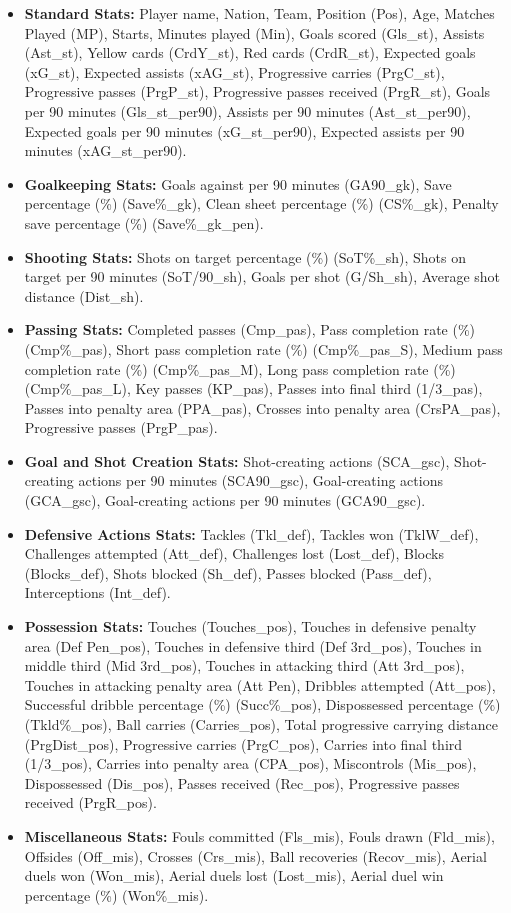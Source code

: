 \documentclass[12pt]{article}
\begin{document}
\begin{itemize}
    \item \textbf{Standard Stats:} Player name, Nation, Team, Position (Pos), Age, Matches Played (MP), Starts, Minutes played (Min), Goals scored (Gls\_st), Assists (Ast\_st), Yellow cards (CrdY\_st), Red cards (CrdR\_st), Expected goals (xG\_st), Expected assists (xAG\_st), Progressive carries (PrgC\_st), Progressive passes (PrgP\_st), Progressive passes received (PrgR\_st), Goals per 90 minutes (Gls\_st\_per90), Assists per 90 minutes (Ast\_st\_per90), Expected goals per 90 minutes (xG\_st\_per90), Expected assists per 90 minutes (xAG\_st\_per90).
    \item \textbf{Goalkeeping Stats:} Goals against per 90 minutes (GA90\_gk), Save percentage (\%) (Save\%\_gk), Clean sheet percentage (\%) (CS\%\_gk), Penalty save percentage (\%) (Save\%\_gk\_pen).
    \item \textbf{Shooting Stats:} Shots on target percentage (\%) (SoT\%\_sh), Shots on target per 90 minutes (SoT/90\_sh), Goals per shot (G/Sh\_sh), Average shot distance (Dist\_sh).
    \item \textbf{Passing Stats:} Completed passes (Cmp\_pas), Pass completion rate (\%) (Cmp\%\_pas), Short pass completion rate (\%) (Cmp\%\_pas\_S), Medium pass completion rate (\%) (Cmp\%\_pas\_M), Long pass completion rate (\%) (Cmp\%\_pas\_L), Key passes (KP\_pas), Passes into final third (1/3\_pas), Passes into penalty area (PPA\_pas), Crosses into penalty area (CrsPA\_pas), Progressive passes (PrgP\_pas).
    \item \textbf{Goal and Shot Creation Stats:} Shot-creating actions (SCA\_gsc), Shot-creating actions per 90 minutes (SCA90\_gsc), Goal-creating actions (GCA\_gsc), Goal-creating actions per 90 minutes (GCA90\_gsc).
    \item \textbf{Defensive Actions Stats:} Tackles (Tkl\_def), Tackles won (TklW\_def), Challenges attempted (Att\_def), Challenges lost (Lost\_def), Blocks (Blocks\_def), Shots blocked (Sh\_def), Passes blocked (Pass\_def), Interceptions (Int\_def).
    \item \textbf{Possession Stats:} Touches (Touches\_pos), Touches in defensive penalty area (Def Pen\_pos), Touches in defensive third (Def 3rd\_pos), Touches in middle third (Mid 3rd\_pos), Touches in attacking third (Att 3rd\_pos), Touches in attacking penalty area (Att Pen), Dribbles attempted (Att\_pos), Successful dribble percentage (\%) (Succ\%\_pos), Dispossessed percentage (\%) (Tkld\%\_pos), Ball carries (Carries\_pos), Total progressive carrying distance (PrgDist\_pos), Progressive carries (PrgC\_pos), Carries into final third (1/3\_pos), Carries into penalty area (CPA\_pos), Miscontrols (Mis\_pos), Dispossessed (Dis\_pos), Passes received (Rec\_pos), Progressive passes received (PrgR\_pos).
    \item \textbf{Miscellaneous Stats:} Fouls committed (Fls\_mis), Fouls drawn (Fld\_mis), Offsides (Off\_mis), Crosses (Crs\_mis), Ball recoveries (Recov\_mis), Aerial duels won (Won\_mis), Aerial duels lost (Lost\_mis), Aerial duel win percentage (\%) (Won\%\_mis).
\end{itemize}
\end{document}
